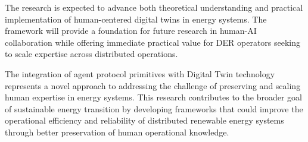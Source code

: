 \documentclass[12pt,a4paper]{article}
\begin{document}
The research is expected to advance both theoretical understanding and practical implementation of human-centered digital twins in energy systems. The framework will provide a foundation for future research in human-AI collaboration while offering immediate practical value for DER operators seeking to scale expertise across distributed operations.

The integration of agent protocol primitives with Digital Twin technology represents a novel approach to addressing the challenge of preserving and scaling human expertise in energy systems. This research contributes to the broader goal of sustainable energy transition by developing frameworks that could improve the operational efficiency and reliability of distributed renewable energy systems through better preservation of human operational knowledge.

\clearpage

\printbibliography
\end{document}
